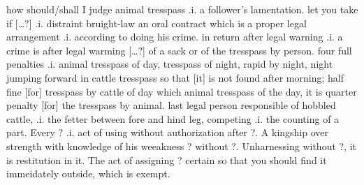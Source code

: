 \documentclass[11pt]{article}
\begin{document}
\begin{pages}
 \begin{Rightside}
    \beginnumbering\pstart  
    how should/shall I judge animal tresspass .i. a follower's lamentation.  let you take if [\ldots?] .i. distraint bruight-law an oral contract which is a proper legal arrangement .i. according to doing his crime.  in return after legal warning .i. a crime is after legal warming [\ldots?] of a sack or of the tresspass by person.  four full penalties .i. animal tresspass of day, tresspass of night, rapid by night, night jumping forward in cattle tresspass so that [it] is not found after morning;  half fine [for] tresspass by cattle of day which animal tresspass of the day, it is quarter penalty [for] the tresspass by animal.  last legal person responsible of hobbled cattle, .i. the fetter between fore and hind leg, competing .i. the counting of a part. Every ? .i. act of using without authorization after ?. A kingship over strength with knowledge of his weeakness ? without ?.  Unharnessing without ?, it is restitution in it.  The act of assigning ? certain so that you should find it immeidately outside, which is exempt.
    \pend
    \endnumbering
  \end{Rightside}

  \Pages
\end{pages}
\end{document}
